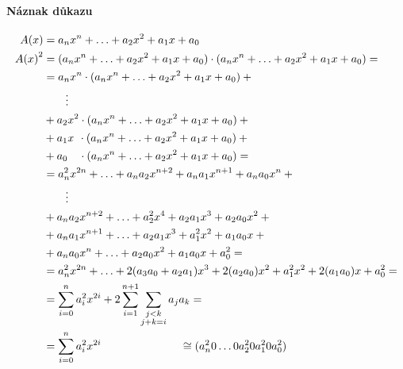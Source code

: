 \documentclass[thesis=M,czech,hidelinks]{FITthesis}[2012/06/26]
\newcommand{\0}{{\textcolor[gray]{0.75}{0}}}
\begin{document}
\paragraph{Náznak důkazu}
\begin{align*}
    A(x)     &=  a_n x^n + \ldots + a_2 x^2 + a_1 x + a_0 \\
    {A(x)}^2 &=  (a_n x^n + \ldots + a_2 x^2 + a_1 x + a_0)\cdot(a_n x^n + \ldots + a_2 x^2 + a_1 x + a_0) = \\
             &= a_n x^n   \cdot (a_n x^n + \ldots + a_2 x^2 + a_1 x + a_0) + {}                              \\
             & \qquad \vdots                                                                                 \\
             &  {} + a_2 x^2   \cdot (a_n x^n + \ldots + a_2 x^2 + a_1 x + a_0) + {}                         \\
             &  {} + a_1 x \, \:  \cdot (a_n x^n + \ldots + a_2 x^2 + a_1 x + a_0) + {}                      \\
             &  {} + a_0 \quad \cdot (a_n x^n + \ldots + a_2 x^2 + a_1 x + a_0) =                            \\
             &= a_n^2 x^{2n}    + \ldots + a_n a_2 x^{n+2} + a_n a_1 x^{n+1} + a_n a_0 x^n + {}              \\
             & \qquad \vdots                                                                                 \\
             &  {} + a_n a_2 x^{n+2} + \ldots + a_2^2 x^4       + a_2 a_1 x^3     + a_2 a_0 x^2 + {}         \\
             &  {} + a_n a_1 x^{n+1} + \ldots + a_2 a_1 x^3     + a_1^2 x^2       + a_1 a_0 x   + {}         \\
             &  {} + a_n a_0 x^n     + \ldots + a_2 a_0 x^2     + a_1 a_0 x       + a_0^2       =            \\
             &= a_n^2 x^{2n} + \ldots  + 2 ( a_3 a_0 + a_2 a_1 ) x^3  + 2 ( a_2 a_0 ) x^2 + a_1^2 x^2 + 2 ( a_1 a_0 ) x + a_0^2 = \\
             &= \sum_{i=0}^{n} a_i^2 x^{2i} + 2 \sum_{i=1}^{n+1}\sum_{\substack{j<k \\ j+k = i}} a_j a_k =   \\
             &= \sum_{i=0}^{n} a_i^2 x^{2i}
    \hspace{2.5cm} \cong (a_n^2 0 \ldots 0 a_2^2 0 a_1^2 0 a_0^2)
\end{align*}
\end{document}
